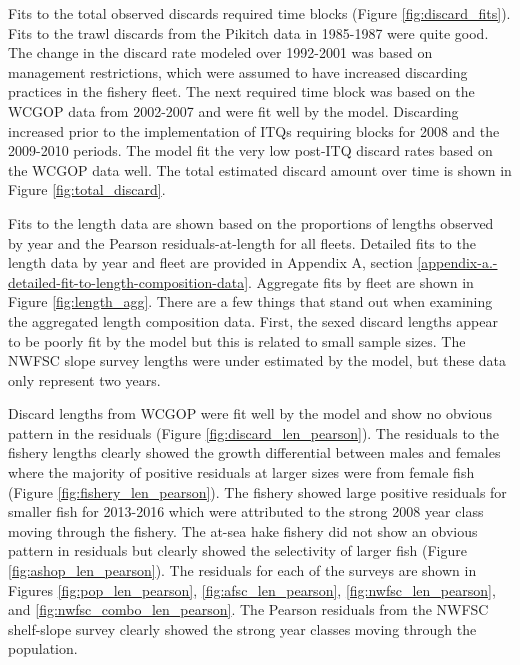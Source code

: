 \documentclass[12pt,]{article}
\begin{document}
Fits to the total observed discards required time blocks (Figure
\ref{fig:discard_fits}). Fits to the trawl discards from the Pikitch
data in 1985-1987 were quite good. The change in the discard rate
modeled over 1992-2001 was based on management restrictions, which were
assumed to have increased discarding practices in the fishery fleet. The
next required time block was based on the WCGOP data from 2002-2007 and
were fit well by the model. Discarding increased prior to the
implementation of ITQs requiring blocks for 2008 and the 2009-2010
periods. The model fit the very low post-ITQ discard rates based on the
WCGOP data well. The total estimated discard amount over time is shown
in Figure \ref{fig:total_discard}.

Fits to the length data are shown based on the proportions of lengths
observed by year and the Pearson residuals-at-length for all fleets.
Detailed fits to the length data by year and fleet are provided in
Appendix A, section
\ref{appendix-a.-detailed-fit-to-length-composition-data}. Aggregate
fits by fleet are shown in Figure \ref{fig:length_agg}. There are a few
things that stand out when examining the aggregated length composition
data. First, the sexed discard lengths appear to be poorly fit by the
model but this is related to small sample sizes. The NWFSC slope survey
lengths were under estimated by the model, but these data only represent
two years.

Discard lengths from WCGOP were fit well by the model and show no
obvious pattern in the residuals (Figure \ref{fig:discard_len_pearson}).
The residuals to the fishery lengths clearly showed the growth
differential between males and females where the majority of positive
residuals at larger sizes were from female fish (Figure
\ref{fig:fishery_len_pearson}). The fishery showed large positive
residuals for smaller fish for 2013-2016 which were attributed to the
strong 2008 year class moving through the fishery. The at-sea hake
fishery did not show an obvious pattern in residuals but clearly showed
the selectivity of larger fish (Figure \ref{fig:ashop_len_pearson}). The
residuals for each of the surveys are shown in Figures
\ref{fig:pop_len_pearson}, \ref{fig:afsc_len_pearson},
\ref{fig:nwfsc_len_pearson}, and \ref{fig:nwfsc_combo_len_pearson}. The
Pearson residuals from the NWFSC shelf-slope survey clearly showed the
strong year classes moving through the population.
\end{document}
